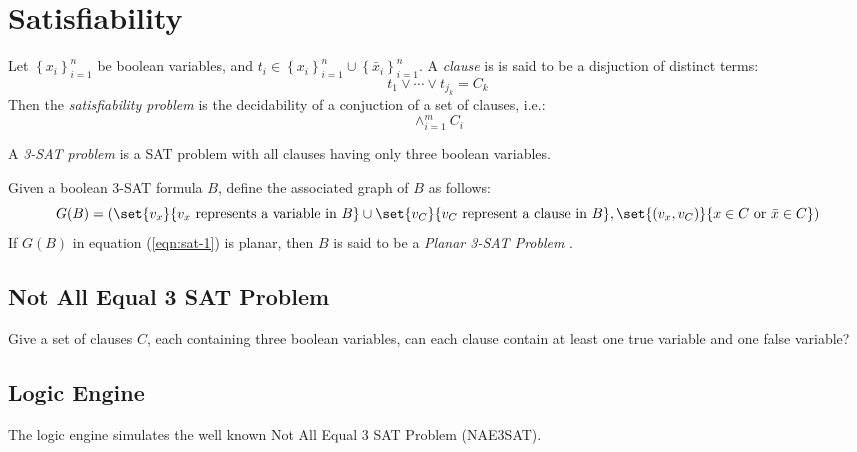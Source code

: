 \section{Satisfiability}
\begin{prob}\label{prob:Satisfiability-1}%
Let $\left\lbrace x_i \right\rbrace_{i=1}^{n} $ be boolean variables, and $t_i \in \left\lbrace 
x_i\right\rbrace_{i=1}^{n}  \cup \left\lbrace \bar{x}_i\right\rbrace_{i=1}^{n}   $.  A 
\textit{clause} is is said to be a disjuction of distinct terms:
$$
t_1 \vee \cdots \vee t_{j_k} = C_k
$$
Then the \textit{satisfiability problem} is the decidability of a conjuction of a set of clauses, 
i.e.:
$$ \wedge_{i=1}^m C_i$$
\end{prob} \cite{skiena2009algorithm}
A \textit{3-SAT problem} is a SAT problem with all clauses having only three boolean variables. 
\begin{definition}\label{def:Satisfiability-2}
Given a boolean 3-SAT formula $B$, define the associated graph of $B$ as follows:  
\begin{equation}\label{eqn:sat-1}
G(B) = \left(\set{v_x}{v_x\text{ represents a variable in }B} \cup \set{v_C}{v_C\text{ represent a 
clause in }B}  , \set{\left( v_x, v_C\right) }{x \in C \text{ or } \bar{x} \in C}  \right) 
\end{equation} 
If $G(B)$ in equation (\ref{eqn:sat-1}) is planar, then $B$ is said to be a \textit{Planar 3-SAT 
Problem} \cite{mulzer2008minimum}.
\end{definition}
\subsection{Not All Equal 3 SAT Problem}
\begin{prob}\label{prob:Satisfiability-2}%
Give a set of clauses $C$, each containing three boolean variables, can each clause contain at 
least one true variable and one false variable?
\end{prob}
\subsection{Logic Engine}
The logic engine simulates the well known Not All Equal 3 SAT Problem (NAE3SAT).  
